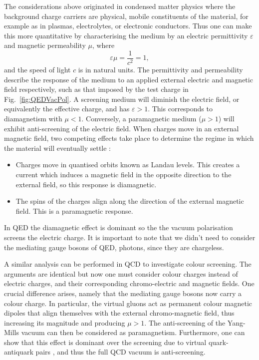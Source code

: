 \documentclass[11pt, a4paper, twoside]{book}
\begin{document}
The considerations above originated in condensed matter physics where the background charge carriers are physical, mobile constituents of the material, for example as in plasmas, electrolytes, or electronic conductors. Thus one can make this more quantitative by characterising the medium by an electric permittivity \(\varepsilon\) and magnetic permeability \(\mu\), where
\begin{equation}
\varepsilon\mu=\frac{1}{c^2}=1,
\end{equation} 
and the speed of light \(c\) is in natural units. The permittivity and permeability describe the response of the medium to an applied external electric and magnetic field respectively, such as that imposed by the test charge in Fig.~\ref{fig:QEDVacPol}. A screening medium will diminish the electric field, or equivalently the effective charge, and has \(\varepsilon >1\). This corresponds to diamagnetism with \(\mu <1\). Conversely, a paramagnetic medium (\(\mu >1\)) will exhibit anti-screening of the electric field. When charges move in an external magnetic field, two competing effects take place to determine the regime in which the material will eventually settle \cite{Kharzeev:2002fm}:
\begin{itemize}
\item{Charges move in quantised orbits known as Landau levels. This creates a current which induces a magnetic field in the opposite direction to the external field, so this response is diamagnetic.}
\item{The spins of the charges align along the direction of the external magnetic field. This is a paramagnetic response.}
\end{itemize}
In QED the diamagnetic effect is dominant so the the vacuum polarisation screens the electric charge. It is important to note that we didn't need to consider the mediating gauge bosons of QED, photons, since they are chargeless.

A similar analysis can be performed in QCD to investigate colour screening. The arguments are identical but now one must consider colour charges instead of electric charges, and their corresponding chromo-electric and magnetic fields. One crucial difference arises, namely that the mediating gauge bosons now carry a colour charge. In particular, the virtual gluons act as permanent colour magnetic dipoles that align themselves with the external chromo-magnetic field, thus increasing its magnitude and producing \(\mu >1\). The anti-screening of the Yang-Mills vacuum can then be considered as paramagnetism. Furthermore, one can show that this effect is dominant over the screening due to virtual quark-antiquark pairs \cite{Nielsen:AF_spin}, and thus the full QCD vacuum is anti-screening.  
\end{document}
